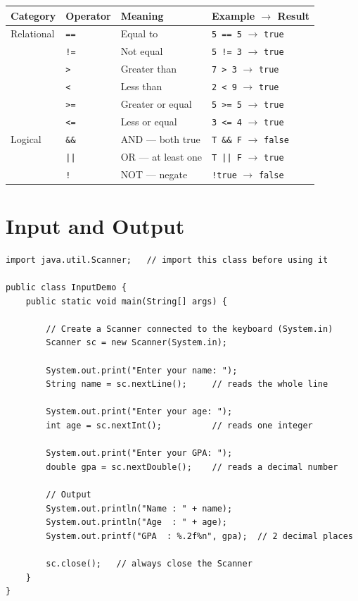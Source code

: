 \documentclass[12pt,a4paper,oneside]{book}
\begin{document}
\begin{center}
\begin{tabular}{llll}
\toprule
\textbf{Category} & \textbf{Operator} & \textbf{Meaning} & \textbf{Example $\to$ Result}\\
\midrule
Relational & \texttt{==}  & Equal to           & \texttt{5 == 5} $\to$ \texttt{true}\\
           & \texttt{!=}  & Not equal          & \texttt{5 != 3} $\to$ \texttt{true}\\
           & \texttt{>}   & Greater than       & \texttt{7 > 3}  $\to$ \texttt{true}\\
           & \texttt{<}   & Less than          & \texttt{2 < 9}  $\to$ \texttt{true}\\
           & \texttt{>=}  & Greater or equal   & \texttt{5 >= 5} $\to$ \texttt{true}\\
           & \texttt{<=}  & Less or equal      & \texttt{3 <= 4} $\to$ \texttt{true}\\
\midrule
Logical    & \texttt{\&\&}& AND --- both true  & \texttt{T \&\& F} $\to$ \texttt{false}\\
           & \texttt{||}  & OR  --- at least one & \texttt{T || F} $\to$ \texttt{true}\\
           & \texttt{!}   & NOT --- negate     & \texttt{!true}  $\to$ \texttt{false}\\
\bottomrule
\end{tabular}
\end{center}

\section{Input and Output}

\begin{lstlisting}[caption={Reading User Input with Scanner}]
import java.util.Scanner;   // import this class before using it

public class InputDemo {
    public static void main(String[] args) {

        // Create a Scanner connected to the keyboard (System.in)
        Scanner sc = new Scanner(System.in);

        System.out.print("Enter your name: ");
        String name = sc.nextLine();     // reads the whole line

        System.out.print("Enter your age: ");
        int age = sc.nextInt();          // reads one integer

        System.out.print("Enter your GPA: ");
        double gpa = sc.nextDouble();    // reads a decimal number

        // Output
        System.out.println("Name : " + name);
        System.out.println("Age  : " + age);
        System.out.printf("GPA  : %.2f%n", gpa);  // 2 decimal places

        sc.close();   // always close the Scanner
    }
}
\end{lstlisting}
\end{document}
